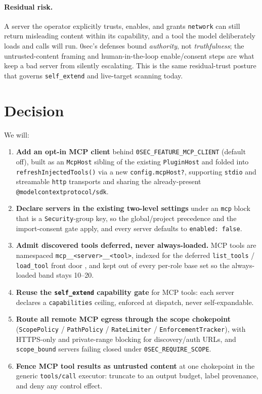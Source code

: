 \documentclass[11pt]{article}
\begin{document}
\paragraph{Residual risk.} A server the operator explicitly trusts, enables, and
grants \texttt{network} can still return misleading content within its
capability, and a tool the model deliberately loads and calls will run. 0sec's
defenses bound \emph{authority}, not \emph{truthfulness}; the untrusted-content
framing and human-in-the-loop enable/consent steps are what keep a bad server
from silently escalating. This is the same residual-trust posture that governs
\texttt{self\_extend} and live-target scanning today.

\section{Decision}

We will:
\begin{enumerate}[leftmargin=*]
  \item \textbf{Add an opt-in MCP client} behind \texttt{0SEC\_FEATURE\_MCP\_CLIENT}
  (default off), built as an \texttt{McpHost} sibling of the existing
  \texttt{PluginHost} and folded into \texttt{refreshInjectedTools()} via a new
  \texttt{config.mcpHost?}, supporting \texttt{stdio} and streamable \texttt{http}
  transports and sharing the already-present \texttt{@modelcontextprotocol/sdk}.
  \item \textbf{Declare servers in the existing two-level settings} under an
  \texttt{mcp} block that is a \texttt{Security}-group key, so the
  global/project precedence and the import-consent gate apply, and every server
  defaults to \texttt{enabled: false}.
  \item \textbf{Admit discovered tools deferred, never always-loaded.} MCP tools
  are namespaced \texttt{mcp\_\_<server>\_\_<tool>}, indexed for the deferred
  \texttt{list\_tools} / \texttt{load\_tool} front door \cite{tool-curation}, and
  kept out of every per-role base set so the always-loaded band stays 10--20.
  \item \textbf{Reuse the \texttt{self\_extend} capability gate} for MCP tools:
  each server declares a \texttt{capabilities} ceiling, enforced at dispatch,
  never self-expandable.
  \item \textbf{Route all remote MCP egress through the scope chokepoint}
  (\texttt{ScopePolicy} / \texttt{PathPolicy} / \texttt{RateLimiter} /
  \texttt{EnforcementTracker}), with HTTPS-only and private-range blocking for
  discovery/auth URLs, and \texttt{scope\_bound} servers failing closed under
  \texttt{0SEC\_REQUIRE\_SCOPE}.
  \item \textbf{Fence MCP tool results as untrusted content} at one chokepoint in
  the generic \texttt{tools/call} executor: truncate to an output budget, label
  provenance, and deny any control effect.
\end{enumerate}
\end{document}
